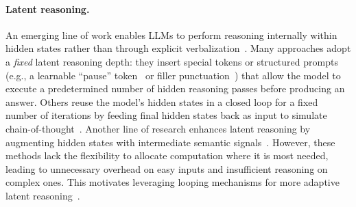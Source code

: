 \vspace{-10pt}
\paragraph{Latent reasoning.}
An emerging line of work enables LLMs to perform reasoning internally within hidden states rather than through explicit verbalization~\citep{goyal2023think, pfau2024let, cheng2024compressed, tack2025llm, konglatent}. Many approaches adopt a \textit{fixed} latent reasoning depth: they insert special tokens or structured prompts (e.g., a learnable ``pause” token~\citep{goyal2023think} or filler punctuation~\citep{pfau2024let}) that allow the model to execute a predetermined number of hidden reasoning passes before producing an answer. Others reuse the model’s hidden states in a closed loop for a fixed number of iterations by feeding final hidden states back as input to simulate chain-of-thought~\citep{hao2024training, shen2025codi, saunshi2025reasoning}. Another line of research enhances latent reasoning by augmenting hidden states with intermediate semantic signals~\citep{zelikman2024quiet, tack2025llm}. However, these methods lack the flexibility to allocate computation where it is most needed, leading to unnecessary overhead on easy inputs and insufficient reasoning on complex ones. 
This motivates leveraging looping mechanisms for more adaptive latent reasoning~\citep{chen2025inner, geiping2025scaling, saunshi2025reasoning, zeng2025pretraining}.
